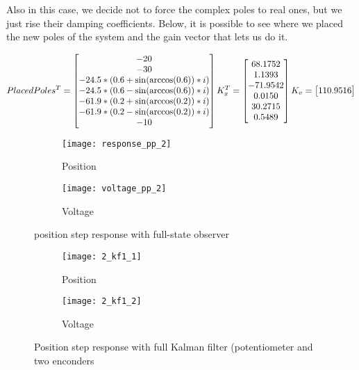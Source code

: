 Also in this case, we decide not to force the complex poles to real ones, but we just rise their damping coefficients. Below, it is possible to see where we placed the new poles of the system and the gain vector that lets us do it.

\begin{equation}
	PlacedPoles^{T} =
	\begin{bmatrix}
		-20 \\ -30 \\ -24.5*(0.6+\sin(\arccos(0.6))*i) \\ -24.5*(0.6-\sin(\arccos(0.6))*i) \\
		-61.9*(0.2+\sin(\arccos(0.2))*i) \\ -61.9*(0.2-\sin(\arccos(0.2))*i) \\ -10
	\end{bmatrix}
	K_x^{T} =
	\begin{bmatrix}
		68.1752  \\  1.1393 \\ -71.9542 \\   0.0150 \\  30.2715  \\  0.5489
	\end{bmatrix}
	\\
	K_v =
	\begin{bmatrix}
		110.9516
	\end{bmatrix}
\end{equation}

\begin{figure*}[h]
	\centering
	\begin{subfigure}{0.5\columnwidth}
		\texttt{[image: response\_pp\_2]}
		\caption{Position}
	\end{subfigure}
	\begin{subfigure}{0.45\columnwidth}
		\texttt{[image: voltage\_pp\_2]}
		\caption{Voltage}
	\end{subfigure}
	\caption{position step response with full-state observer}
\end{figure*}

\begin{figure*}[h]
	\centering
	\begin{subfigure}{0.5\columnwidth}
		\texttt{[image: 2\_kf1\_1]}
		\caption{Position}
	\end{subfigure}
	\begin{subfigure}{0.45\columnwidth}
		\texttt{[image: 2\_kf1\_2]}
		\caption{Voltage}
	\end{subfigure}
	\caption{Position step response with full Kalman filter (potentiometer and two enconders}
\end{figure*}

